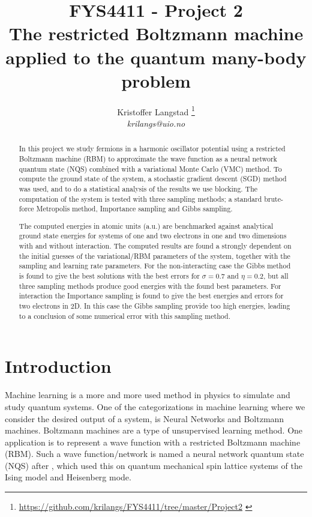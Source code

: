 \documentclass[12pt,a4paper,english]{article}
\title{FYS4411 - Project 2\\ The restricted Boltzmann machine applied to the quantum many-body problem}
\date{}
\author{ Kristoffer Langstad \footnote{\url{https://github.com/krilangs/FYS4411/tree/master/Project2} \cite{GitHub}}\\ \textit{krilangs@uio.no}}
\begin{document}
\maketitle
\begin{abstract}
In this project we study fermions in a harmonic oscillator potential using a restricted Boltzmann machine (RBM) to approximate the wave function as a neural network quantum state (NQS) combined with a variational Monte Carlo (VMC) method. To compute the ground state of the system, a stochastic gradient descent (SGD) method was used, and to do a statistical analysis of the results we use blocking. The computation of the system is tested with three sampling methods; a standard brute-force Metropolis method, Importance sampling and Gibbs sampling.

The computed energies in atomic units (a.u.) are benchmarked against analytical ground state energies for systems of one and two electrons in one and two dimensions with and without interaction. The computed results are found a strongly dependent on the initial guesses of the variational/RBM parameters of the system, together with the sampling and learning rate parameters. For the non-interacting case the Gibbs method is found to give the best solutions with the best errors for $\sigma=0.7$ and $\eta=0.2$, but all three sampling methods produce good energies with the found best parameters. For interaction the Importance sampling is found to give the best energies and errors for two electrons in 2D. In this case the Gibbs sampling provide too high energies, leading to a conclusion of some numerical error with this sampling method.
\end{abstract}


\section{Introduction}
\label{sect:Introduction}
Machine learning is a more and more used method in physics to simulate and study quantum systems. One of the categorizations in machine learning where we consider the desired output of a system, is Neural Networks and Boltzmann machines. Boltzmann machines are a type of unsupervised learning method. One application is to represent a wave function with a restricted Boltzmann machine (RBM). Such a wave function/network is named a neural network quantum state (NQS) after \citet{carleo2017solving}, which used this on quantum mechanical spin lattice systems of the Ising model and Heisenberg mode.
\end{document}
